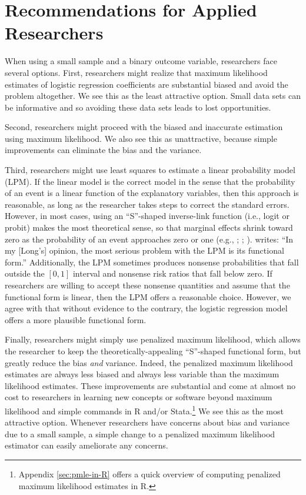 \documentclass[12pt]{article}
\begin{document}
\section*{Recommendations for Applied Researchers}

When using a small sample and a binary outcome variable, researchers face several options. First, researchers might realize that maximum likelihood estimates of logistic regression coefficients are substantial biased and avoid the problem altogether. 
We see this as the least attractive option. 
Small data sets can be informative and so avoiding these data sets leads to lost opportunities.

Second, researchers might proceed with the biased and inaccurate estimation using maximum likelihood. 
We also see this as unattractive, because simple improvements can eliminate the bias and the variance.

Third, researchers might use least squares to estimate a linear probability model (LPM). If the linear model is the correct model in the sense that the probability of an event is a linear function of the explanatory variables, then this approach is reasonable, as long as the researcher takes steps to correct the standard errors. 
However, in most cases, using an ``S''-shaped inverse-link function (i.e., logit or probit) makes the most theoretical sense, so that marginal effects shrink toward zero as the probability of an event approaches zero or one (e.g., \citealt{Rainey2015}; \citealt{BerryDeMerittEsarey2010}; \citealt[pp. 34-47]{Long1997}). 
\citet[p. 40]{Long1997} writes: ``In my [Long's] opinion, the most serious problem with the LPM is its functional form.'' 
Additionally, the LPM sometimes produces nonsense probabilities that fall outside the $[0, 1]$ interval and nonsense risk ratios that fall below zero.
If researchers are willing to accept these nonsense quantities and assume that the functional form is linear, then the LPM offers a reasonable choice. 
However, we agree with \cite{Long1997} that without evidence to the contrary, the logistic regression model offers a more plausible functional form.

Finally, researchers might simply use penalized maximum likelihood, which allows the researcher to keep the theoretically-appealing ``S''-shaped functional form, but greatly reduce the bias \textit{and} variance. 
Indeed, the penalized maximum likelihood estimates are always less biased and always less variable than the maximum likelihood estimates.
These improvements are substantial and come at almost no cost to researchers in learning new concepts or software beyond maximum likelihood and simple commands in R and/or Stata.\footnote{Appendix \ref{sec:pmle-in-R} offers a quick overview of computing penalized maximum likelihood estimates in R.} 
We see this as the most attractive option. 
Whenever researchers have concerns about bias and variance due to a small sample, a simple change to a penalized maximum likelihood estimator can easily ameliorate any concerns. 
\end{document}
